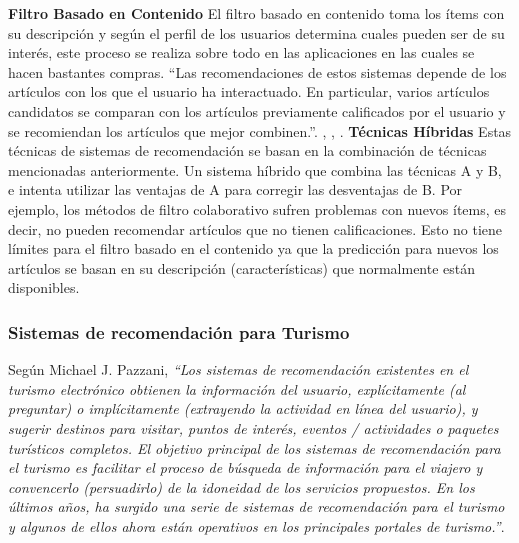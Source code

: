 \documentclass[12pt,letterpaper,openany]{book}
\begin{document}
\vspace{5mm}\newline
\textbf{Filtro Basado en Contenido}\newline
El filtro basado en contenido toma los ítems con su descripción y según el perfil de los usuarios determina cuales pueden ser de su interés, este proceso se realiza sobre todo en las aplicaciones en las cuales se hacen bastantes compras. “Las recomendaciones de estos sistemas depende de los artículos con los que el usuario ha interactuado. En particular, varios artículos candidatos se comparan con los artículos previamente calificados por el usuario y se recomiendan los artículos que mejor combinen.”. \cite{13}, \cite{16}, \cite{17}.
\vspace{5mm}\newline
\textbf{Técnicas Híbridas}\newline
Estas técnicas de sistemas de recomendación se basan en la combinación de técnicas mencionadas anteriormente. Un sistema híbrido que combina las técnicas A y B, e intenta utilizar las ventajas de A para corregir las desventajas de B. Por ejemplo, los métodos de filtro colaborativo sufren problemas con nuevos ítems, es decir, no pueden recomendar artículos que no tienen calificaciones. Esto no tiene límites para el filtro basado en el contenido ya que la predicción para nuevos los artículos se basan en su descripción (características) que normalmente están disponibles\cite{13}. 

\subsubsection{Sistemas de recomendación para Turismo}
Según Michael J. Pazzani, \textit{“Los sistemas de recomendación existentes en el turismo electrónico obtienen la información del usuario, explícitamente (al preguntar) o implícitamente (extrayendo la actividad en línea del usuario), y sugerir destinos para visitar, puntos de interés, eventos / actividades o paquetes turísticos completos. El objetivo principal de los sistemas de recomendación para el turismo es facilitar el proceso de búsqueda de información para el viajero y convencerlo (persuadirlo) de la idoneidad de los servicios propuestos. En los últimos años, ha surgido una serie de sistemas de recomendación para el turismo y algunos de ellos ahora están operativos en los principales portales de turismo.”}\cite{16}. 
\end{document}
